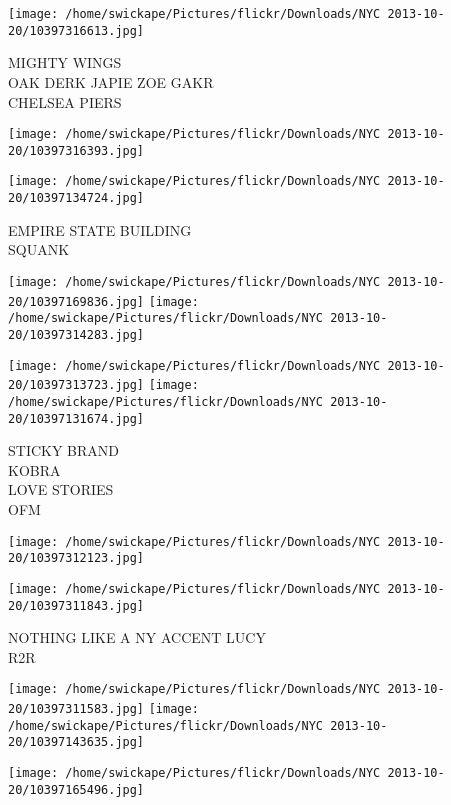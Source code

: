 \documentclass[10pt,letterpaper]{article}
\begin{document}
\vspace{0.25in}
\texttt{[image: /home/swickape/Pictures/flickr/Downloads/NYC 2013-10-20/10397316613.jpg]}

MIGHTY WINGS\\
OAK DERK JAPIE ZOE GAKR\\
CHELSEA PIERS\\
\pagebreak

\texttt{[image: /home/swickape/Pictures/flickr/Downloads/NYC 2013-10-20/10397316393.jpg]}

\vspace{0.25in}
\texttt{[image: /home/swickape/Pictures/flickr/Downloads/NYC 2013-10-20/10397134724.jpg]}

EMPIRE STATE BUILDING\\
SQUANK\\
\pagebreak

\texttt{[image: /home/swickape/Pictures/flickr/Downloads/NYC 2013-10-20/10397169836.jpg]}
\texttt{[image: /home/swickape/Pictures/flickr/Downloads/NYC 2013-10-20/10397314283.jpg]}

\texttt{[image: /home/swickape/Pictures/flickr/Downloads/NYC 2013-10-20/10397313723.jpg]}
\texttt{[image: /home/swickape/Pictures/flickr/Downloads/NYC 2013-10-20/10397131674.jpg]}

STICKY BRAND\\
KOBRA\\
LOVE STORIES\\
OFM\\
\pagebreak

\texttt{[image: /home/swickape/Pictures/flickr/Downloads/NYC 2013-10-20/10397312123.jpg]}

\vspace{0.25in}
\texttt{[image: /home/swickape/Pictures/flickr/Downloads/NYC 2013-10-20/10397311843.jpg]}

NOTHING LIKE A NY ACCENT LUCY\\
R2R\\
\pagebreak

\texttt{[image: /home/swickape/Pictures/flickr/Downloads/NYC 2013-10-20/10397311583.jpg]}
\texttt{[image: /home/swickape/Pictures/flickr/Downloads/NYC 2013-10-20/10397143635.jpg]}

\vspace{0.25in}
\texttt{[image: /home/swickape/Pictures/flickr/Downloads/NYC 2013-10-20/10397165496.jpg]}
\end{document}
